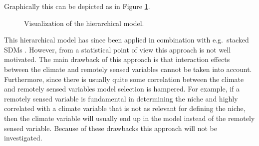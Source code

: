 Graphically this can be depicted as in Figure \ref{fig:chClassificationTechniques:HierarchicalClassification}.\\

\begin{figure}[!htb]
\centering
{}
\caption{\label{fig:chClassificationTechniques:HierarchicalClassification}Visualization of the hierarchical model.}
\end{figure}

This hierarchical model has since been applied in combination with e.g.\ stacked SDMs \parencite{cord_remote_2014}. However, from a statistical point of view this approach is not well motivated. The main drawback of this approach is that interaction effects between the climate and remotely sensed variables cannot be taken into account. Furthermore, since there is usually quite some correlation between the climate and remotely sensed variables model selection is hampered. For example, if a remotely sensed variable is fundamental in determining the niche and highly correlated with a climate variable that is not as relevant for defining the niche, then the climate variable will usually end up in the model instead of the remotely sensed variable. Because of these drawbacks this approach will not be investigated.







